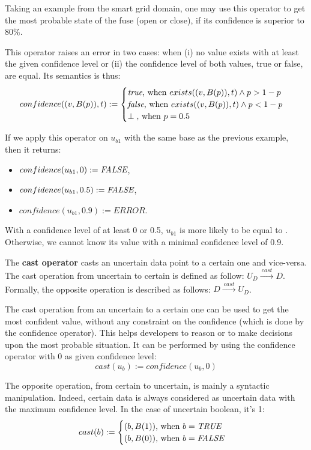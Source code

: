 Taking an example from the smart grid domain, one may use this operator to get the most probable state of the fuse (open or close), if its confidence is superior to 80\%.

This operator raises an error in two cases: when (i) no value exists with at least the given confidence level or (ii) the confidence level of both values, true or false, are equal.
Its semantics is thus:
$$confidence((v, B(p)), t) := \begin{cases}
												\text{\textit{true}, when } exists((v, B(p)), t) \land p >  1-p \\
												\text{\textit{false}, when } exists((v, B(p)), t) \land p < 1-p \\
												\perp \text{, when } p = 0.5
											\end{cases}$$
												
If we apply this operator on $u_{b1}$ with the same base as the previous example, then it returns:
\begin{itemize}
	\item $confidence(u_{b1}, 0) := \textit{FALSE}{}$,
	\item $confidence(u_{b1}, 0.5) := \textit{FALSE}{}$,
	\item $confidence(u_{b1}, 0.9) := ERROR$.
\end{itemize}
With a confidence level of at least 0 or 0.5, $u_{b1}$ is more likely to be equal to \false{}.
Otherwise, we cannot know its value with a minimal confidence level of 0.9.

\begin{operator}
	\label{op:cast}
	The \textbf{cast operator} casts an uncertain data point to a certain one and vice-versa. 
	The cast operation from uncertain to certain is defined as follow: $U_D \xrightarrow{~cast~} D$.
	Formally, the opposite operation is described as follows: $D \xrightarrow{~cast~} U_D$.
\end{operator}

The cast operation from an uncertain to a certain one can be used to get the most confident value, without any constraint on the confidence (which is done by the confidence operator).
This helps developers to reason or to make decisions upon the most probable situation.
It can be performed by using the confidence operator with 0 as given confidence level:
$$cast(u_b) := confidence(u_b, 0)$$

The opposite operation, from certain to uncertain, is mainly a syntactic manipulation.
Indeed, certain data is always considered as uncertain data with the maximum confidence level.
In the case of uncertain boolean, it's 1:
$$cast(b) := \begin{cases}
                        (b, B(1)) \text{, when } b = \textit{TRUE}{}\\
                        (b, B(0)) \text{, when } b = \textit{FALSE}{}
                    \end{cases}$$
  
